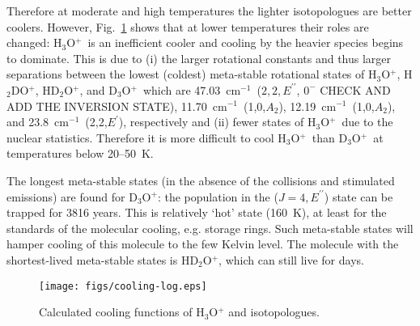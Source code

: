 \documentclass[prb,preprint,12pt,superscriptaddress,floatfix,bibnotes,nofootinbib,unsortedaddress,preprintnumbers,amsmath,amssymb]{revtex4}
\newcommand{\red}[1]{{\color{red} #1}}
\newcommand{\cm}{cm$^{-1}$}
\newcommand{\p}{^\prime}
\newcommand{\pp}{^{\prime\prime}}
\newcommand{\ohhh}{H$_3$O$^{+}$}
\newcommand{\oddd}{D$_3$O$^{+}$}
\newcommand{\ohhd}{H$_2$DO$^{+}$}
\newcommand{\ohdd}{HD$_2$O$^{+}$}
\newcommand{\2}{$_{2}$}
\newcommand{\3}{$_{3}$}
\begin{document}
Therefore at moderate and high temperatures the lighter isotopologues are better
coolers. However, Fig.~\ref{fig:cooling} shows that at lower temperatures their
roles are changed: \ohhh\ is an inefficient cooler and cooling by the
heavier species begins to dominate. This is due to (i) the larger
rotational constants and thus larger separations between the lowest (coldest)
meta-stable rotational states of \ohhh, \ohhd, \ohdd, and \oddd\, which are
47.03~\cm\ ($2,2,E\pp$, $0^-$ \red{CHECK AND ADD THE INVERSION STATE}), 11.70~\cm\ (1,0,$A_2$), 12.19~\cm\ (1,0,$A_2$), and
23.8~\cm\ (2,2,$E\p$), respectively and (ii) fewer states of \ohhh\ due to the
nuclear statistics. Therefore it is more difficult to cool \ohhh\ than \oddd\ at
temperatures below 20--50~K.

The longest meta-stable states (in the absence of the collisions and stimulated
emissions) are found for \oddd: the population in the ($J=4,E\pp$) state can be
trapped for 3816 years. This is relatively `hot' state (160~K), at least for the
standards of the molecular cooling, e.g. storage rings. Such meta-stable states
will hamper cooling of this molecule to the few Kelvin level. The molecule with
the shortest-lived meta-stable states is \ohdd, which can still live for days.








\begin{figure}%

  \texttt{[image: figs/cooling-log.eps]}

  \caption{\label{fig:cooling} Calculated cooling functions of H$_3$O$^+$ and isotopologues.}


\end{figure}
\end{document}
